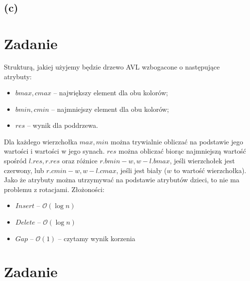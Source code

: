 \documentclass[12pt, a4paper]{article}
\newcommand{\MCALO}{\mathcal{O}}
\newcounter{zadanie}
\newcommand{\zadanie}{\addtocounter{zadanie}{1}\section*{Zadanie \arabic{zadanie}}}
\begin{document}
\subsection*{(c)}

\zadanie{}
Strukturą, jakiej użyjemy będzie drzewo AVL wzbogacone o następujące atrybuty:
\begin{itemize}
  \item $bmax,cmax$ -- największy element dla obu kolorów;
  \item $bmin,cmin$ -- najmniejszy element dla obu kolorów;
  \item $res$ -- wynik dla poddrzewa.
\end{itemize}
Dla każdego wierzchołka $max, min$ można trywialnie obliczać na podstawie jego
wartości i wartości w jego synach. $res$ można obliczać biorąc najmniejszą
wartość spośród $l.res, r.res$ oraz różnice $r.bmin - w, w - l.bmax$, jeśli
wierzchołek jest czerwony, lub $r.cmin - w, w - l.cmax$, jeśli jest biały ($w$
to wartość wierzchołka). Jako że atrybuty można utrzymywać na podstawie
atrybutów dzieci, to nie ma problemu z rotacjami.
Złożoności:
\begin{itemize}
  \item $\mathit{Insert}$ -- $\MCALO(\log{n})$
  \item $\mathit{Delete}$ -- $\MCALO(\log{n})$
  \item $\mathit{Gap}$ -- $\MCALO(1)$ -- czytamy wynik korzenia
\end{itemize}

\zadanie{}
\end{document}
